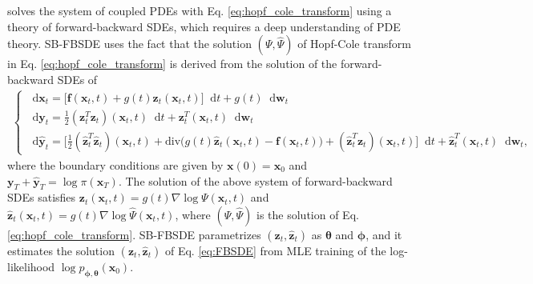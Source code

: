 \documentclass{article}
\theoremstyle{definition}
\theoremstyle{remark}
\newcommand*\diff{\mathop{}\!\mathrm{d}}
\begin{document}
	\citet{chen2021likelihood} solves the system of coupled PDEs with Eq. \eqref{eq:hopf_cole_transform} using a theory of forward-backward SDEs, which requires a deep understanding of PDE theory. SB-FBSDE \cite{chen2021likelihood} uses the fact that the solution $(\Psi,\hat{\Psi})$ of Hopf-Cole transform in Eq. \eqref{eq:hopf_cole_transform} is derived from the solution of the forward-backward SDEs of
	\begin{align}\label{eq:FBSDE}
	\left\{\begin{array}{l}
	\diff\mathbf{x}_{t}=\big[\mathbf{f}(\mathbf{x}_{t},t)+g(t)\mathbf{z}_{t}(\mathbf{x}_{t},t)\big]\diff t+g(t)\diff\mathbf{w}_{t}\\[0.5em]
	\diff\mathbf{y}_{t}=\frac{1}{2}(\mathbf{z}_{t}^{T}\mathbf{z}_{t})(\mathbf{x}_{t},t)\diff t+\mathbf{z}_{t}^{T}(\mathbf{x}_{t},t)\diff\mathbf{w}_{t}\\[0.5em]
	\diff\mathbf{\hat{y}}_{t}=\Big[\frac{1}{2}(\mathbf{\hat{z}}_{t}^{T}\mathbf{\hat{z}}_{t})(\mathbf{x}_{t},t)+\text{div}\big(g(t)\mathbf{\hat{z}}_{t}(\mathbf{x}_{t},t)-\mathbf{f}(\mathbf{x}_{t},t)\big)+(\mathbf{\hat{z}}_{t}^{T}\mathbf{z}_{t})(\mathbf{x}_{t},t)\Big]\diff t+\mathbf{\hat{z}}_{t}^{T}(\mathbf{x}_{t},t)\diff\mathbf{w}_{t},
	\end{array}\right.
	\end{align}
	where the boundary conditions are given by $\mathbf{x}(0)=\mathbf{x}_{0}$ and $\mathbf{y}_{T}+\mathbf{\hat{y}}_{T}=\log{\pi(\mathbf{x}_{T})}$. The solution of the above system of forward-backward SDEs satisfies $\mathbf{z}_{t}(\mathbf{x}_{t},t)=g(t)\nabla\log{\Psi(\mathbf{x}_{t},t)}$ and $\mathbf{\hat{z}}_{t}(\mathbf{x}_{t},t)=g(t)\nabla\log{\hat{\Psi}(\mathbf{x}_{t},t)}$, where $(\Psi,\hat{\Psi})$ is the solution of Eq. \eqref{eq:hopf_cole_transform}. SB-FBSDE parametrizes $(\mathbf{z}_{t},\mathbf{\hat{z}}_{t})$ as $\bm{\theta}$ and $\bm{\phi}$, and it estimates the solution $(\mathbf{z}_{t},\mathbf{\hat{z}}_{t})$ of Eq. \eqref{eq:FBSDE} from MLE training of the log-likelihood $\log{p_{\bm{\phi},\bm{\theta}}(\mathbf{x}_{0})}$.
	
	
	
\end{document}
